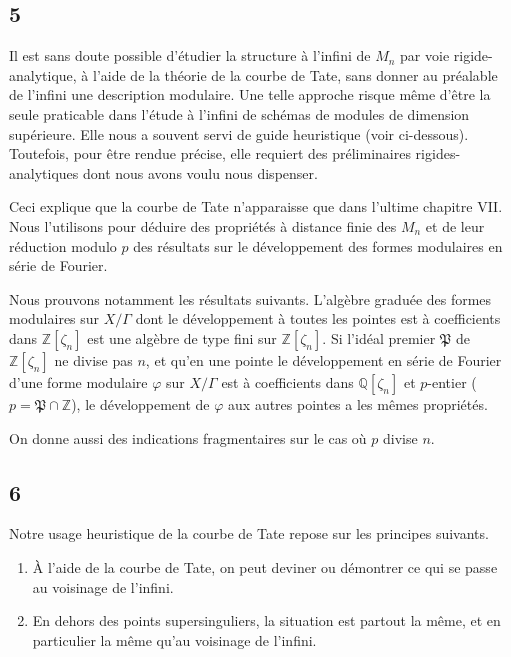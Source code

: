\documentclass{amsart}
\theoremstyle{plain}
\theoremstyle{remark}
\newcommand{\bbQ}{\mathbb{Q}}
\newcommand{\bbZ}{\mathbb{Z}}
\newcommand{\fP}{\mathfrak{P}}
\begin{document}
\subsection*{5}
Il est sans doute possible d'\'etudier la structure \`a l'infini de $M_n$ par voie rigide-analytique, \`a l'aide de la th\'eorie de la courbe de Tate, sans donner au pr\'ealable de l'infini une description modulaire. Une telle approche risque m\^eme d'\^etre la seule praticable dans l'\'etude \`a l'infini de sch\'emas de modules de dimension sup\'erieure. Elle nous a souvent servi de guide heuristique (voir ci-dessous). Toutefois, pour \^etre rendue pr\'ecise, elle requiert des pr\'eliminaires rigides-analytiques dont nous avons voulu nous dispenser.

Ceci explique que la courbe de Tate n'apparaisse que dans l'ultime chapitre VII. Nous l'utilisons pour d\'eduire des propri\'et\'es \`a distance finie des $M_n$ et de leur r\'eduction modulo $p$ des r\'esultats sur le d\'eveloppement des formes modulaires en s\'erie de Fourier.

Nous prouvons notamment les r\'esultats suivants. L'alg\`ebre gradu\'ee des formes modulaires sur $X/\Gamma$ dont le d\'eveloppement \`a toutes les pointes est \`a coefficients dans $\bbZ[\zeta_n]$ est une alg\`ebre de type fini sur $\bbZ[\zeta_n]$. Si l'id\'eal premier $\fP$ de $\bbZ[\zeta_n]$ ne divise pas $n$, et qu'en une pointe le d\'eveloppement en s\'erie de Fourier d'une forme modulaire $\varphi$ sur $X/\Gamma$ est \`a coefficients dans $\bbQ[\zeta_n]$ et $p$-entier ($p = \fP \cap \bbZ$), le d\'eveloppement de $\varphi$ aux autres pointes a les m\^emes propri\'et\'es.

On donne aussi des indications fragmentaires sur le cas o\`u $p$ divise $n$.

\subsection*{6}
Notre usage heuristique de la courbe de Tate repose sur les principes suivants.

\begin{enumerate}
\item[a)] \`A l'aide de la courbe de Tate, on peut deviner ou d\'emontrer ce qui se passe au voisinage de l'infini.
\item[b)] En dehors des points supersinguliers, la situation est partout la m\^eme, et en particulier la m\^eme qu'au voisinage de l'infini.
\end{enumerate}
\end{document}
